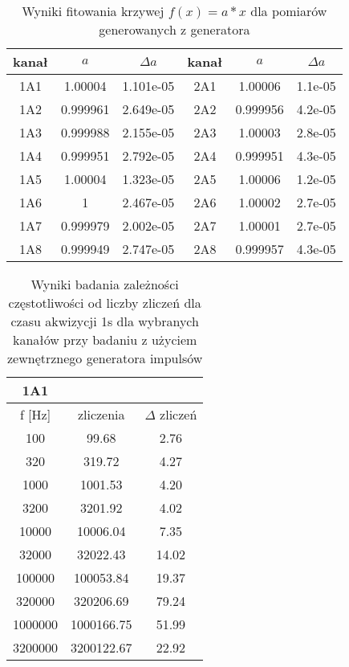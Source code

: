 \begin{appendices}
\begin{table}
    \centering
    \caption{Wyniki fitowania krzywej $f(x) = a*x$ dla pomiarów generowanych z generatora}
    \label{multi fit}
    \begin{tabular}{|c|c|c||c|c|c|}
            \hline
            kanał & $a$ & $\Delta a$  &kanał & $a$ & $\Delta a$ \\ \hline
            1A1 & 1.00004 & 1.101e-05 & 2A1 &1.00006&1.1e-05 \\ \hline
            1A2 & 0.999961 &2.649e-05& 2A2 &0.999956&4.2e-05 \\ \hline
            1A3 & 0.999988&2.155e-05&2A3 & 1.00003&2.8e-05\\ \hline
            1A4 & 0.999951&2.792e-05&2A4&0.999951&4.3e-05\\ \hline
            1A5&1.00004&1.323e-05&2A5&1.00006&1.2e-05\\ \hline
            1A6&1&2.467e-05&2A6&1.00002&2.7e-05 \\ \hline
            1A7&0.999979&2.002e-05&2A7&1.00001&2.7e-05 \\ \hline
            1A8 &0.999949&2.747e-05&2A8&0.999957&4.3e-05 \\ \hline
    \end{tabular}
\end{table}

\begin{table}
    \centering
    \caption{Wyniki badania zależności częstotliwości od liczby zliczeń dla czasu akwizycji 1s dla wybranych kanałów przy badaniu z użyciem zewnętrznego generatora impulsów}
    \label{tabela wyniki surowe}
    \begin{multicols}{3}
            \begin{adjustbox}{width=1\linewidth,left}
            \begin{tabular}{|c|c|c|}  
                    \hline 
                    1A1 & & \\ \hline
                    f [Hz] & zliczenia & $\Delta$ zliczeń \\ \hline
                   100 & 99.68 & 2.76\\ \hline 
                   320 & 319.72 & 4.27\\ \hline 
                   1000 & 1001.53 & 4.20\\ \hline 
                   3200 & 3201.92 & 4.02\\ \hline 
                   10000 & 10006.04 & 7.35\\ \hline 
                   32000 & 32022.43 & 14.02\\ \hline 
                   100000 & 100053.84 & 19.37\\ \hline 
                   320000 & 320206.69 & 79.24\\ \hline 
                   1000000 & 1000166.75 & 51.99\\ \hline 
                   3200000 & 3200122.67 & 22.92\\ \hline
           \end{tabular}
           \end{adjustbox}
           \begin{adjustbox}{width=1\linewidth,left}


\end{adjustbox}
\end{multicols}
\end{table}
\end{appendices}
